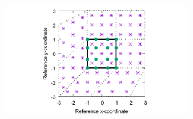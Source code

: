 \begin{figure}[t]
\noindent\includegraphics[width=19pc,angle=0]{figs/mapping/mapping.pdf}\\
\caption{}
\label{fig:mapping}
\end{figure}
